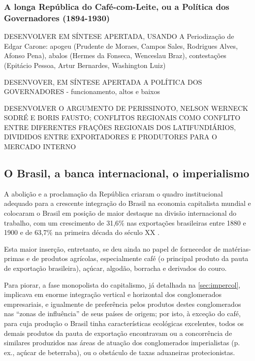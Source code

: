 \subsubsection{A longa República do Café-com-Leite, ou a Política dos Governadores (1894-1930)}\label{subsubsec:cafeleite}

DESENVOLVER EM SÍNTESE APERTADA, USANDO A Periodização de Edgar Carone: apogeu (Prudente de Moraes, Campos Sales, Rodrigues Alves, Afonso Pena), abalos (Hermes da Fonseca, Wenceslau Braz), contestações (Epitácio Pessoa, Artur Bernardes, Washington Luiz) \cite{carone_evolucao_1977}

DESENVOVER, EM SÍNTESE APERTADA A POLÍTICA DOS GOVERNADORES - funcionamento, altos e baixos 

DESENVOLVER O ARGUMENTO DE PERISSINOTO, NELSON WERNECK SODRÉ E BORIS FAUSTO; CONFLITOS REGIONAIS COMO CONFLITO ENTRE DIFERENTES FRAÇÕES REGIONAIS DOS LATIFUNDIÁRIOS, DIVIDIDOS ENTRE EXPORTADORES E PRODUTORES PARA O MERCADO INTERNO

\subsection{O Brasil, a banca internacional, o imperialismo}\label{subsec:brasimper}

A abolição e a proclamação da República criaram o quadro institucional adequado para a crescente integração do Brasil na economia capitalista mundial e colocaram o Brasil em posição de maior destaque na divisão internacional do trabalho, com um crescimento de 31,6\% nas exportações brasileiras entre 1880 e 1900 e de 63,7\% na primeira década do século XX \cite[p.~352]{singer_braecomu_1977}. 

Esta maior inserção, entretanto, se deu ainda no papel de fornecedor de matérias-primas e de produtos agrícolas, especialmente café (o principal produto da pauta de exportação brasileira), açúcar, algodão, borracha e derivados do couro.





Para piorar, a fase monopolista do capitalismo, já detalhada na \autoref{sec:impercol}, implicava em enorme integração vertical e horizontal dos conglomerados empresariais, e igualmente de preferência pelos produtos destes conglomerados nas ``zonas de influência'' de seus países de origem; por isto, à exceção do café, para cuja produção o Brasil tinha características ecológicas excelentes, todos os demais produtos da pauta de exportação encontravam ou a concorrência de similares produzidos nas áreas de atuação dos conglomerados imperialistas (p. ex., açúcar de beterraba), ou o obstáculo de taxas aduaneiras protecionistas.

